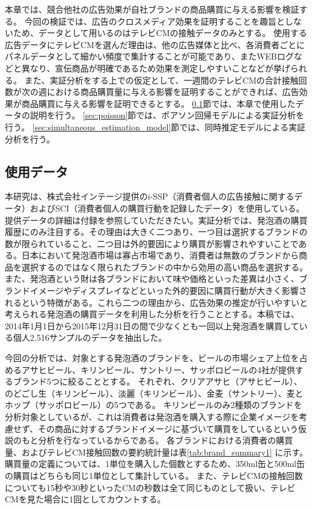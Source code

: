 \documentclass[11pt]{jsarticle}
\begin{document}
本章では、競合他社の広告効果が自社ブランドの商品購買に与える影響を検証する。
今回の検証では、広告のクロスメディア効果を証明することを趣旨としないため、データとして用いるのはテレビCMの接触データのみとする。
使用する広告データにテレビCMを選んだ理由は、他の広告媒体と比べ、各消費者ごとにパネルデータとして細かい頻度で集計することが可能であり、またWEBログなどと異なり、宣伝商品が明確であるため効果を測定しやすいことなどが挙げられる。
また、実証分析をする上での仮定として、一週間のテレビCMの合計接触回数が次の週における商品購買量に与える影響を証明することができれば、広告効果が商品購買に与える影響を証明できるとする。
\ref{sec:empirical_data}節では、本章で使用したデータの説明を行う。
\ref{sec:poisson}節では、ポアソン回帰モデルによる実証分析を行う。
\ref{sec:simultaneous_estimation_model}節では、同時推定モデルによる実証分析を行う。

\subsection{使用データ}
\label{sec:empirical_data}
本研究は、株式会社インテージ提供のi-SSP（消費者個人の広告接触に関するデータ）およびSCI（消費者個人の購買行動を記録したデータ）を使用している。提供データの詳細は付録を参照していただきたい。実証分析では、発泡酒の購買履歴にのみ注目する。その理由は大きく二つあり、一つ目は選択するブランドの数が限られていること、二つ目は外的要因により購買が影響されやすいことである。日本において発泡酒市場は寡占市場であり、消費者は無数のブランドから商品を選択するのではなく限られたブランドの中から効用の高い商品を選択する。また、発泡酒という財は各ブランドにおいて味や価格といった差異は小さく、ブランドイメージやディスプレイなどといった外的要因に購買行動が大きく影響されるという特徴がある。これら二つの理由から、広告効果の推定が行いやすいと考えられる発泡酒の購買データを利用した分析を行うこととする。本稿では、2014年1月1日から2015年12月31日の間で少なくとも一回以上発泡酒を購買している個人2,516サンプルのデータを抽出した。

今回の分析では、対象とする発泡酒のブランドを、ビールの市場シェア上位を占めるアサヒビール、キリンビール、サントリー、サッポロビールの4社が提供するブランド5つに絞ることとする。
それぞれ、クリアアサヒ（アサヒビール）、のどごし生（キリンビール）、淡麗（キリンビール）、金麦（サントリー）、麦とホップ（サッポロビール）の5つである。
キリンビールのみ2種類のブランドを分析対象としているが、これは消費者は発泡酒を購入する際に企業イメージを考慮せず、その商品に対するブランドイメージに基づいて購買をしているという仮説のもと分析を行なっているからである。
各ブランドにおける消費者の購買量、およびテレビCM接触回数の要約統計量は表\ref{tab:brand_summary1} に示す。
購買量の定義については、1単位を購入した個数とするため、350ml缶と500ml缶の購買はどちらも同じ1単位として集計している。
また、テレビCMの接触回数についても15秒や30秒といったCMの秒数は全て同じものとして扱い、テレビCMを見た場合に1回としてカウントする。
\end{document}
